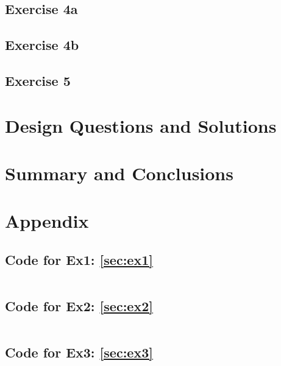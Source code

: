 \documentclass[12pt]{article}
\begin{document}
\subsection{Exercise 4a}\label{sec:ex4a}

\subsection{Exercise 4b}\label{sec:ex4b}

\subsection{Exercise 5}\label{sec:ex5}

\pagebreak

\section{Design Questions and Solutions}\label{sec:design}

\pagebreak

\section{Summary and Conclusions}\label{sec:summary}


\pagebreak





\pagebreak
\section*{Appendix}\label{sec:appendix}
\subsection*{Code for Ex1: \ref{sec:ex1}}
\inputminted{matlab}{matlab/ex1.m}

\subsection*{Code for Ex2: \ref{sec:ex2}}
\inputminted{matlab}{matlab/ex2.m}

\subsection*{Code for Ex3: \ref{sec:ex3}}
\inputminted{matlab}{matlab/ex3.m}



\end{document}
